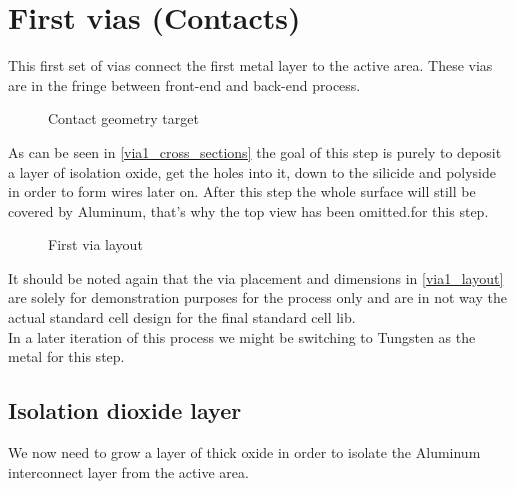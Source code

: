 \section{First vias (Contacts)}\label{via1}

This first set of vias connect the first metal layer to the active area.
These vias are in the fringe between front-end and back-end process.

\begin{figure}[H]
	\centering
	\begin{tikzpicture}[node distance = 3cm, auto, thick,scale=\CrossSectionOnly, every node/.style={transform shape}]
		
	\end{tikzpicture}
	\caption{Contact geometry target}
	\label{via1_cross_sections}
\end{figure}

As can be seen in \autoref{via1_cross_sections} the goal of this step is purely to deposit a layer of isolation oxide, get the holes into it, down to the silicide and polyside in order to form wires later on.
After this step the whole surface will still be covered by Aluminum, that's why the top view has been omitted.for this step.

\begin{figure}[H]
	\centering
	\begin{tikzpicture}[node distance =1cm, auto, thick,scale=\VLSILayout, every node/.style={transform shape}]
		
	\end{tikzpicture}
	\caption{First via layout}
	\label{via1_layout}
\end{figure}

It should be noted again that the via placement and dimensions in \autoref{via1_layout} are solely for demonstration purposes for the process only and are in not way the actual standard cell design for the final standard cell lib. \\

In a later iteration of this process we might be switching to Tungsten as the metal for this step.

\newpage

\subsection{Isolation dioxide layer}

We now need to grow a layer of thick oxide in order to isolate the Aluminum interconnect layer from the active area.

